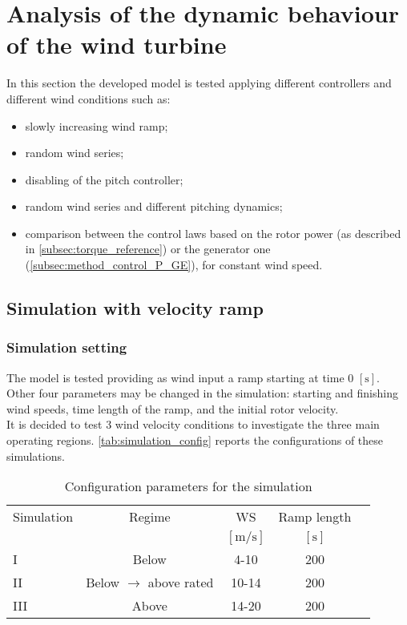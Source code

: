 \newpage
\section{Analysis of the dynamic behaviour of the wind turbine}\label{sec:c_basic_model_simulation}
In this section the developed model is tested applying different controllers and different wind conditions such as:
\begin{itemize}
  \item slowly increasing wind ramp;
  \item random wind series;
  \item disabling of the pitch controller;
  \item random wind series and different pitching dynamics;
  \item comparison between the control laws based on the rotor power (as described in \autoref{subsec:torque_reference}) or the generator one (\autoref{subsec:method_control_P_GE}), for constant wind speed.
\end{itemize}
\subsection{Simulation with velocity ramp}
\subsubsection{Simulation setting}
The model is tested providing as wind input a ramp starting at time 0 $\left[\si{\second}\right]$. Other four parameters may be changed in the simulation: starting and finishing wind speeds, time length of the ramp, and the initial rotor velocity.\\
It is decided to test 3 wind velocity conditions to investigate the three main operating regions. \autoref{tab:simulation_config} reports the configurations of these simulations. 
\begin{table}[htb]
    \caption{Configuration parameters for the simulation}
    \centering
    \begin{tabular}{lcccc}
    \toprule
      Simulation & Regime  & WS & Ramp length \\ 
       & & $\left[\si{\meter\per\second}\right]$ & $\left[\si{\second}\right]$ \\ \midrule       
       I & Below & 4-10 & 200  \\
       II & Below $\rightarrow$ above rated & 10-14 & 200 \\
       III & Above & 14-20 & 200  \\
       \bottomrule
    \end{tabular}
    \label{tab:simulation_config}
\end{table}

